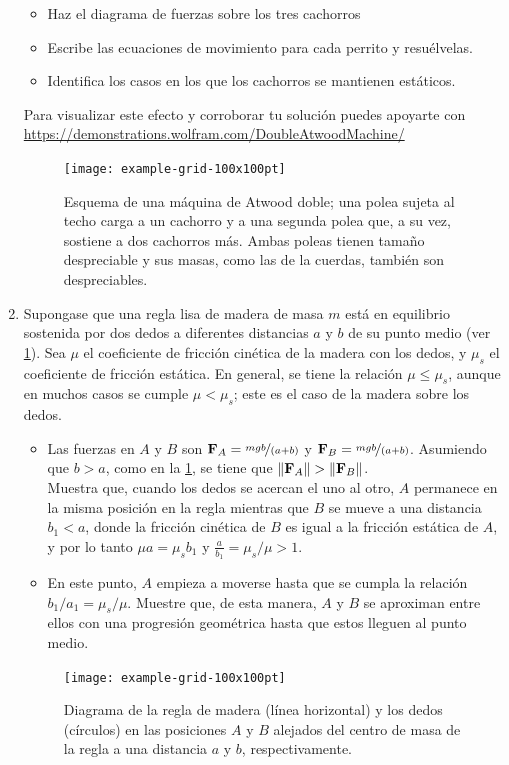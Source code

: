 \documentclass[12pt]{article}
\theoremstyle{problem}
\begin{document}
\begin{enumerate}[label=\textbf{1.\arabic*)}]
\begin{itemize}[label = \textbullet]
        \item Haz el diagrama de fuerzas sobre los tres cachorros
        \item Escribe las ecuaciones de movimiento para cada perrito y resuélvelas.
        \item Identifica los casos en los que los cachorros se mantienen estáticos.
    \end{itemize}
    Para visualizar este efecto y corroborar tu solución puedes apoyarte con \url{https://demonstrations.wolfram.com/DoubleAtwoodMachine/}
    \begin{figure}[htb]
        \centering
        \texttt{[image: example-grid-100x100pt]}
        \caption{\footnotesize Esquema de una máquina de Atwood doble; una polea sujeta al techo carga a un cachorro y a una segunda polea que, a su vez, sostiene a dos cachorros más. Ambas poleas tienen tamaño despreciable y sus masas, como las de la cuerdas, también son despreciables.} 
    \end{figure}
    \pagebreak
    \item Supongase que una regla lisa de madera de masa \(m\) está en equilibrio sostenida por dos dedos a diferentes distancias \(a\) y \(b\) de su punto medio (ver \cref{fig:regla}).	Sea \(\mu\) el coeficiente de fricción cinética de la madera con los dedos, y \(\mu_{s}\) el coeficiente de fricción estática. En general, se tiene la relación \(\mu \leq \mu_{s}\), aunque en muchos casos se cumple \(\mu <\mu_{s}\); este es el caso de la madera sobre los dedos.
	\begin{itemize}[label = \textbullet]
		\item Las fuerzas en \(A\) y \(B\) son \(\vb{F}_{A}=\nicefrac{mgb}{(a+b)}\) y \(\vb{F}_{B}=\nicefrac{mgb}{(a+b)}\). 	Asumiendo que \(b>a\), como en la \cref{fig:regla}, se tiene que \(\norm{\vb{F}_{A}}>\norm{\vb{F}_B}\).\\
		Muestra que, cuando los dedos se acercan el uno al otro, \(A\) permanece en la misma posición en la regla mientras que \(B\) se mueve a una distancia \(b_{1}<a\), donde la fricción cinética de \(B\) es igual a la fricción estática de \(A\), y por lo tanto \(\mu a=\mu_{s} b_{1}\) y \(\frac{a}{b_{1}}=\mu_{s}/\mu>1\).
		\item En este punto, \(A\) empieza a moverse hasta que se cumpla la relación \(b_{1}/{a_{1}}={\mu_{s}}/{\mu}\).	Muestre que, de esta manera, \(A\) y \(B\) se aproximan entre ellos con una progresión geométrica hasta que estos lleguen al punto medio. 
	\end{itemize}
    \begin{figure}[htb]
        \centering
        \texttt{[image: example-grid-100x100pt]}
        \caption{\footnotesize Diagrama de la regla de madera (línea horizontal) y los dedos (círculos) en las posiciones \(A\) y \(B\) alejados del centro de masa de la regla a una distancia \(a\) y \(b\), respectivamente.}
        \label{fig:regla}
    \end{figure}
\end{enumerate}
\end{document}
